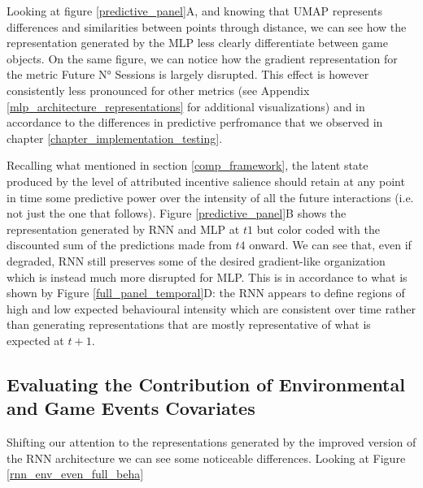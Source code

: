Looking at figure \ref{predictive_panel}A, and knowing that UMAP represents differences and similarities between points through distance, we can see how the representation generated by the MLP less clearly differentiate between game objects. On the same figure, we can notice how the gradient representation for the metric Future N° Sessions is largely disrupted. This effect is however consistently less pronounced for other metrics (see Appendix \ref{mlp_architecture_representations} for additional visualizations) and in accordance to the differences in predictive perfromance that we observed in chapter \ref{chapter_implementation_testing}. 

Recalling what mentioned in section \ref{comp_framework}, the latent state produced by the level of attributed incentive salience should retain at any point in time some predictive power over the intensity of all the future interactions (i.e. not just the one that follows). Figure \ref{predictive_panel}B shows the representation generated by RNN and MLP at $t1$ but color coded with the discounted sum of the predictions made from $t4$ onward. We can see that, even if degraded, RNN still preserves some of the desired gradient-like organization which is instead much more disrupted for MLP. This is in accordance to what is shown by Figure \ref{full_panel_temporal}D: the RNN appears to define regions of high and low expected behavioural intensity which are consistent over time rather than generating representations that are mostly representative of what is expected at $t+1$.

\subsection{Evaluating the Contribution of Environmental and Game Events Covariates}
\label{representation_env_even_contr}
Shifting our attention to the representations generated by the improved version of the RNN architecture we can see some noticeable differences. Looking at Figure \ref{rnn_env_even_full_beha} 

